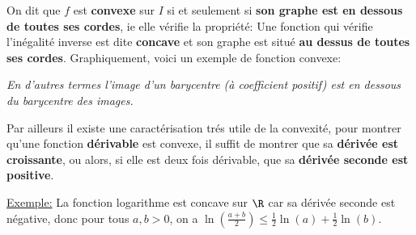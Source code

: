 On dit que \(f\) est \textbf{convexe} sur \(I\) si et seulement si \textbf{son graphe est en dessous de toutes ses cordes}, ie elle vérifie la propriété:
Une fonction qui vérifie l'inégalité inverse est dite \textbf{concave} et son graphe est situé \textbf{au dessus de toutes ses cordes}.
Graphiquement, voici un exemple de fonction convexe:
\begin{center}
\end{center}
\begin{center}
   \textit{
      En d'autres termes l'image d'un barycentre (à coefficient positif) est en dessous du barycentre des images.
   }
\end{center}
Par ailleurs il existe une caractérisation trés utile de la convexité, pour montrer qu'une fonction \textbf{dérivable} est convexe, il suffit de montrer que sa \textbf{dérivée est croissante}, ou alors, si elle est deux fois dérivable, que sa \textbf{dérivée seconde est positive}.\<

\underline{Exemple:}  La fonction logarithme est concave sur \(\R\) car sa dérivée seconde est négative, donc pour tous \(a, b > 0\), on a \(\ln(\frac{a + b}{2}) \leq \frac{1}{2}\ln(a) + \frac{1}{2}\ln(b)\).

\subsection*{}

